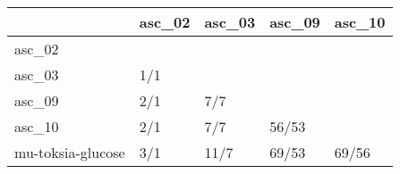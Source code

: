 \begin{tabular}{lllll}
\toprule
{} & asc\_02 & asc\_03 & asc\_09 & asc\_10 \\
\midrule
asc\_02            &        &        &        &        \\
asc\_03            &    1/1 &        &        &        \\
asc\_09            &    2/1 &    7/7 &        &        \\
asc\_10            &    2/1 &    7/7 &  56/53 &        \\
mu-toksia-glucose &    3/1 &   11/7 &  69/53 &  69/56 \\
\bottomrule
\end{tabular}
